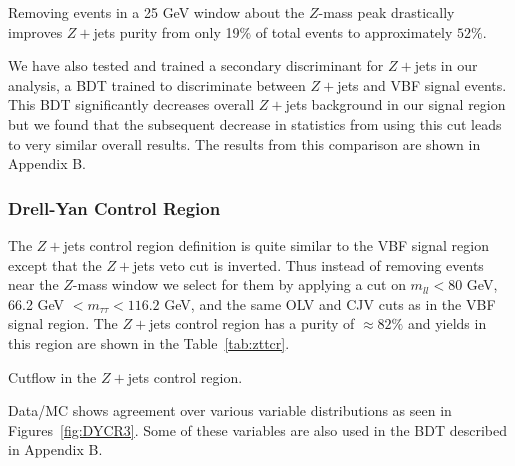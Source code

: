 Removing events in a 25 GeV window about the $Z$-mass peak drastically improves $Z+$jets purity from only 19$\%$ of total events to approximately $52\%$. 

We have also tested and trained a secondary discriminant for $Z+$jets in our analysis, a BDT trained to discriminate between $Z+$jets and VBF signal events. This BDT significantly decreases overall $Z+$jets background in our signal region but we found that the subsequent decrease in statistics from using this cut leads to very similar overall results. The results from this comparison are shown in Appendix B. 

\subsubsection{Drell-Yan Control Region}

The $Z+$jets control region definition is quite similar to the VBF signal region except that the $Z+$jets veto cut is inverted. Thus instead of removing events near the $Z$-mass window we select for them by applying a cut on $m_{ll}<80$ GeV,  66.2 GeV $< m_{\tau\tau}< 116.2$ GeV, and the same OLV and CJV cuts as in the VBF signal region. The $Z+$jets control region has a purity of $\approx 82\%$ and yields in this region are shown in the Table~\ref{tab:zttcr}.

\begin{table}[h!]
\centering
\scalebox{0.65}{

}
\caption{Cutflow in the $Z+$jets control region.}
\label{tab:zttcr}
\end{table}

Data/MC shows agreement over various variable distributions as seen in Figures~\ref{fig:DYCR3}. Some of these variables are also used in the BDT described in Appendix B. 

